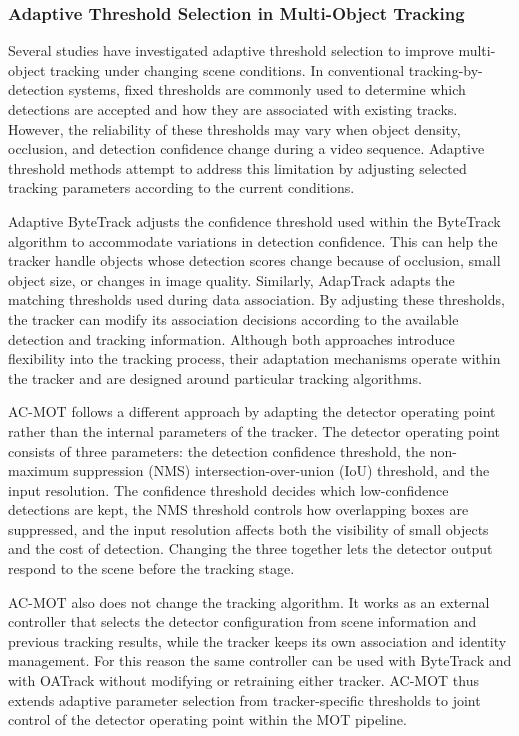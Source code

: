 \documentclass[pdflatex,sn-mathphys-num,iicol]{sn-jnl}
\begin{document}
\subsubsection{Adaptive Threshold Selection in Multi-Object Tracking}
Several studies have investigated adaptive threshold selection to improve multi-object tracking under changing scene conditions. In conventional tracking-by-detection systems, fixed thresholds are commonly used to determine which detections are accepted and how they are associated with existing tracks. However, the reliability of these thresholds may vary when object density, occlusion, and detection confidence change during a video sequence. Adaptive threshold methods attempt to address this limitation by adjusting selected tracking parameters according to the current conditions.

Adaptive ByteTrack adjusts the confidence threshold used within the ByteTrack \cite{ma2023adaptivebytetrack} algorithm to accommodate variations in detection confidence. This can help the tracker handle objects whose detection scores change because of occlusion, small object size, or changes in image quality. Similarly, AdapTrack \cite{shim2024adaptrack} adapts the matching thresholds used during data association. By adjusting these thresholds, the tracker can modify its association decisions according to the available detection and tracking information. Although both approaches introduce flexibility into the tracking process, their adaptation mechanisms operate within the tracker and are designed around particular tracking algorithms.

AC-MOT follows a different approach by adapting the detector operating point rather than the internal parameters of the tracker. The detector operating point consists of three parameters: the detection confidence threshold, the non-maximum suppression (NMS) intersection-over-union (IoU) threshold, and the input resolution. The confidence threshold decides which low-confidence detections are kept, the NMS threshold controls how overlapping boxes are suppressed, and the input resolution affects both the visibility of small objects and the cost of detection. Changing the three together lets the detector output respond to the scene before the tracking stage.

AC-MOT also does not change the tracking algorithm. It works as an external controller that selects the detector configuration from scene information and previous tracking results, while the tracker keeps its own association and identity management. For this reason the same controller can be used with ByteTrack and with OATrack without modifying or retraining either tracker. AC-MOT thus extends adaptive parameter selection from tracker-specific thresholds to joint control of the detector operating point within the MOT pipeline.
\end{document}
